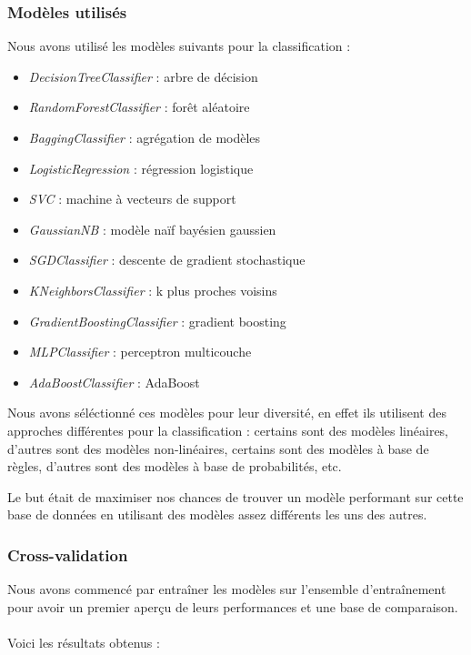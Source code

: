 \documentclass{article}
\begin{document}
\subsubsection{Modèles utilisés}
Nous avons utilisé les modèles suivants pour la classification :
\begin{itemize}
    \item \textit{DecisionTreeClassifier} \cite{DTC} : arbre de décision
    \item \textit{RandomForestClassifier} \cite{RFC} : forêt aléatoire
    \item \textit{BaggingClassifier} \cite{BC} : agrégation de modèles
    \item \textit{LogisticRegression} \cite{LR} : régression logistique
    \item \textit{SVC} \cite{SVC} : machine à vecteurs de support
    \item \textit{GaussianNB} \cite{GNB} : modèle naïf bayésien gaussien
    \item \textit{SGDClassifier} \cite{SGD} : descente de gradient stochastique
    \item \textit{KNeighborsClassifier} \cite{KNN} : k plus proches voisins
    \item \textit{GradientBoostingClassifier} \cite{GNB} : gradient boosting
    \item \textit{MLPClassifier} \cite{MLP} : perceptron multicouche
    \item \textit{AdaBoostClassifier} \cite{ABC} : AdaBoost
\end{itemize}

Nous avons séléctionné ces modèles pour leur diversité, en effet ils utilisent
des approches différentes pour la classification : certains sont des modèles linéaires,
d'autres sont des modèles non-linéaires, certains sont des modèles à base de règles,
d'autres sont des modèles à base de probabilités, etc. 

Le but était de maximiser nos chances de trouver un modèle performant sur cette
base de données en utilisant des modèles assez différents les uns des autres.

\subsubsection{Cross-validation}
Nous avons commencé par entraîner les modèles sur l'ensemble d'entraînement pour
avoir un premier aperçu de leurs performances et une base de comparaison.
\\\\
Voici les résultats obtenus :
\end{document}
